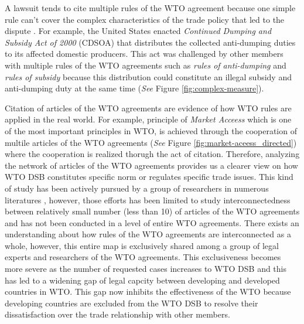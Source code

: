 A lawsuit tends to cite multiple rules of the WTO agreement because one simple rule can't cover the complex characteristics of the trade policy that led to the dispute \citep{palmeter2004dispute}.
For example, the United States enacted \textit{Continued Dumping and Subsidy Act of 2000} (CDSOA) that distributes
the collected anti-dumping duties to its affected domestic producers.
This act was challenged by other members with multiple rules of
the WTO agreements such as \textit{rules of anti-dumping} and \textit{rules of subsidy} because
this distribution could constitute an illegal subsidy and anti-dumping duty at the same time (\textit{See} Figure \ref{fig:complex-measure}).

Citation of articles of the WTO agreements are evidence of how WTO rules are applied in the real world. 
For example, principle of \textit{Market Acceess} which is one of the most important principles in WTO, is achieved through the cooperation of multile articles of the WTO agreements (\textit{See} Figure \ref{fig:market-aceess_directed}) where the cooperation is realized thorugh the act of citation.
Therefore, analyzing the network of articles of the WTO agreements provides us a clearer view on how WTO DSB constitutes specific norm or regulates specific trade issues. 
This kind of study has been actively pursued by a group of researchers in numerous literatures \citep{chadXXIII, charnovitz, Trachtman, who_gets}, however, those efforts has been limited to 
study interconnectedness between relatively small number (less than 10) of articles of the WTO agreements and has not been conducted in a level of entire WTO agreements.
There exists an understanding about how rules of the WTO agreements are interconnected as a whole, however, this entire map is exclusively shared among a group of legal experts and researchers of the WTO agreements.
This exclusiveness becomes more severe as the number of requested cases increases to WTO DSB and this has led to a widening gap of legal capcity between developing and developed countries in WTO. 
This gap now inhibits the effectiveness of the WTO because developing countries are excluded from the WTO DSB to resolve their dissatisfaction over the trade relationship with other members.



